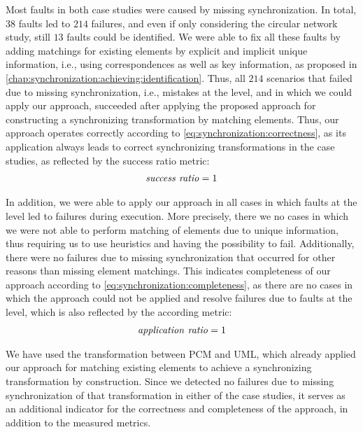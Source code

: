 Most faults in both case studies were caused by missing synchronization.
In total, $38$ faults led to $214$ failures, and even if only considering the circular network study, still $13$ faults could be identified.
We were able to fix all these faults by adding matchings for existing elements by explicit and implicit unique information, i.e., using correspondences as well as key information, as proposed in \autoref{chap:synchronization:achieving:identification}.
Thus, all $214$ scenarios that failed due to missing synchronization, i.e., mistakes at the \leveltransformation level, and in which we could apply our approach, succeeded after applying the proposed approach for constructing a synchronizing transformation by matching elements.
Thus, our approach operates correctly according to \autoref{eq:synchronization:correctness}, as its application always leads to correct synchronizing transformations in the case studies, as reflected by the success ratio metric:
\begin{align*}
    \mathit{success\ ratio} = 1
\end{align*}

In addition, we were able to apply our approach in all cases in which faults at the \leveltransformation level led to failures during execution.
More precisely, there we no cases in which we were not able to perform matching of elements due to unique information, thus requiring us to use heuristics and having the possibility to fail.
Additionally, there were no failures due to missing synchronization that occurred for other reasons than missing element matchings.
This indicates completeness of our approach according to \autoref{eq:synchronization:completeness}, as there are no cases in which the approach could not be applied and resolve failures due to faults at the \leveltransformation level, which is also reflected by the according metric:
\begin{align*}
    \mathit{application\ ratio} = 1
\end{align*}

We have used the transformation between \gls{PCM} and \gls{UML}, which already applied our approach for matching existing elements to achieve a synchronizing transformation by construction.
Since we detected no failures due to missing synchronization of that transformation in either of the case studies, it serves as an additional indicator for the correctness and completeness of the approach, in addition to the measured metrics.

